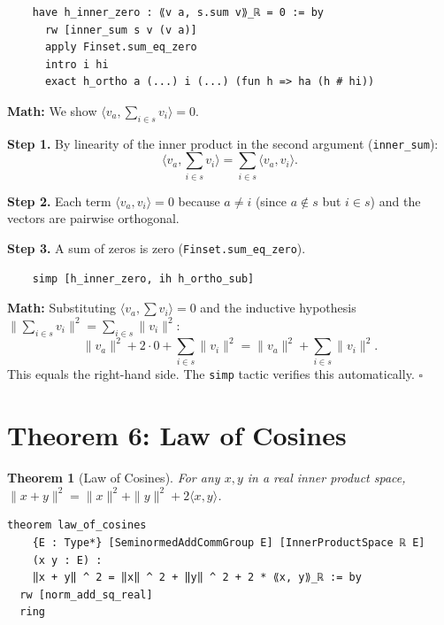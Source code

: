 \documentclass[11pt]{article}
\theoremstyle{plain}
\newtheorem{theorem}{Theorem}[section]
\theoremstyle{definition}
\begin{document}
\begin{tcolorbox}[title=Lines 15--20: The cross term vanishes]
\begin{lstlisting}
    have h_inner_zero : ⟪v a, s.sum v⟫_ℝ = 0 := by
      rw [inner_sum s v (v a)]
      apply Finset.sum_eq_zero
      intro i hi
      exact h_ortho a (...) i (...) (fun h => ha (h # hi))
\end{lstlisting}
\textbf{Math:} We show $\langle v_a, \sum_{i \in s} v_i\rangle = 0$.

\textbf{Step 1.} By linearity of the inner product in the second argument
(\texttt{inner\_sum}):
\[
  \bigl\langle v_a, \textstyle\sum_{i \in s} v_i \bigr\rangle
  = \sum_{i \in s} \langle v_a, v_i \rangle.
\]

\textbf{Step 2.} Each term $\langle v_a, v_i\rangle = 0$ because $a \neq i$
(since $a \notin s$ but $i \in s$) and the vectors are pairwise orthogonal.

\textbf{Step 3.} A sum of zeros is zero (\texttt{Finset.sum\_eq\_zero}).
\end{tcolorbox}

\begin{tcolorbox}[title=Line 21: Combine everything]
\begin{lstlisting}
    simp [h_inner_zero, ih h_ortho_sub]
\end{lstlisting}
\textbf{Math:} Substituting $\langle v_a, \sum v_i\rangle = 0$ and the
inductive hypothesis $\|\sum_{i\in s} v_i\|^2 = \sum_{i\in s}\|v_i\|^2$:
\[
  \|v_a\|^2 + 2 \cdot 0 + \sum_{i \in s} \|v_i\|^2
  = \|v_a\|^2 + \sum_{i \in s} \|v_i\|^2.
\]
This equals the right-hand side. The \texttt{simp} tactic verifies this
automatically. $\square$
\end{tcolorbox}

\section{Theorem 6: Law of Cosines}

\begin{theorem}[Law of Cosines]
For any $x, y$ in a real inner product space,
$\|x+y\|^2 = \|x\|^2 + \|y\|^2 + 2\langle x,y\rangle$.
\end{theorem}

\begin{lstlisting}
theorem law_of_cosines
    {E : Type*} [SeminormedAddCommGroup E] [InnerProductSpace ℝ E]
    (x y : E) :
    ‖x + y‖ ^ 2 = ‖x‖ ^ 2 + ‖y‖ ^ 2 + 2 * ⟪x, y⟫_ℝ := by
  rw [norm_add_sq_real]
  ring
\end{lstlisting}
\end{document}
